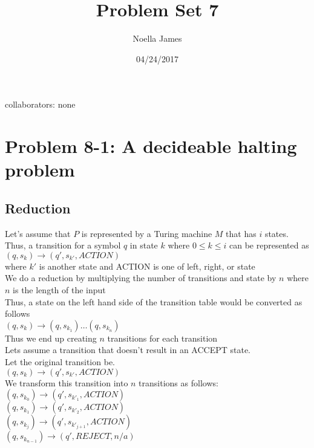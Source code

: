 \documentclass{article}
\theoremstyle{definition}
\theoremstyle{remark}
\theoremstyle{plain}
\begin{document}
\title{Problem Set 7}
\date{04/24/2017}
\author{Noella James}
\maketitle
collaborators: none\\

\section*{Problem 8-1: A decideable halting problem}

\subsection*{Reduction}
Let's assume that $P$ is represented by a Turing machine $M$ that has $i$ states. Thus, a transition for a symbol $q$ in state $k$ where $0 \leq k \leq i $ can be represented as\\
$(q, s_k) \rightarrow (q', s_{k'}, ACTION)$ \\
where $k'$ is another state and ACTION is one of left, right, or state\\

We do a reduction by multiplying the number of transitions and state by $n$ where $n$ is the length of the input\\

Thus, a state on the left hand side of the transition table would be converted as follows \\

$(q, s_k)  \rightarrow (q, s_{k_1}) \ldots (q, s_{k_n})$\\

Thus we end up creating $n$ transitions for each transition\\

Lets assume a transition that doesn't result in an ACCEPT state. \\

Let the original transition be.\\
$(q, s_k) \rightarrow (q', s_{k'}, ACTION)$\\

We transform this transition into $n$ transitions as follows:\\

$(q, s_{k_0}) \rightarrow (q', s_{k'_1}, ACTION)$\\
$(q, s_{k_1}) \rightarrow (q', s_{k'_2}, ACTION)$\\
$(q, s_{k_j}) \rightarrow (q', s_{k'_{j+1}}, ACTION)$\\
$(q, s_{k_{n-1}}) \rightarrow (q', REJECT, n/a)$\\
\end{document}
